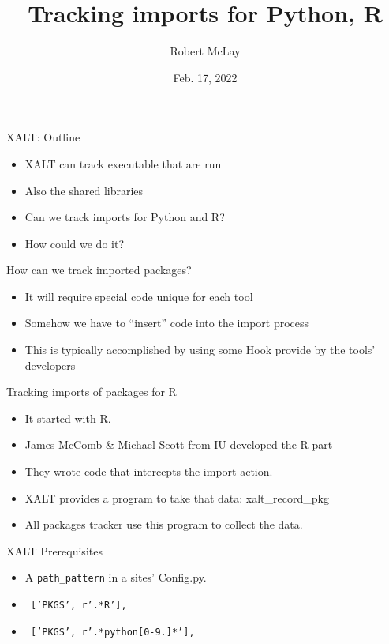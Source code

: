 \documentclass{beamer}
\begin{document}
\title[XALT]{Tracking imports for Python, R}
\author{Robert McLay} 
\date{Feb. 17, 2022} 

\frame{\titlepage} 

\begin{frame}{XALT: Outline}
  \begin{itemize}
    \item XALT can track executable that are run
    \item Also the shared libraries
    \item Can we track imports for Python and R?
    \item How could we do it?
  \end{itemize}
\end{frame}

\begin{frame}{How can we track imported packages?}
  \begin{itemize}
    \item It will require special code unique for each tool
    \item Somehow we have to ``insert'' code into the import process
    \item This is typically accomplished by using some Hook provide by
      the tools' developers
  \end{itemize}
\end{frame}

\begin{frame}{Tracking imports of packages for R}
  \begin{itemize}
    \item It started with R.
    \item James McComb \& Michael Scott from IU developed the R part
    \item They wrote code that intercepts the import action.
    \item XALT provides a program to take that data: xalt\_record\_pkg
    \item All packages tracker use this program to collect the data.
  \end{itemize}
\end{frame}

\begin{frame}{XALT Prerequisites}
  \begin{itemize}
    \item A \texttt{path\_pattern} in a sites' Config.py.
    \item \texttt{ ['PKGS',  r'.*\/R'],}
    \item \texttt{ ['PKGS',  r'.*\/python[0-9.]*'],}
  \end{itemize}
\end{frame}
\end{document}
